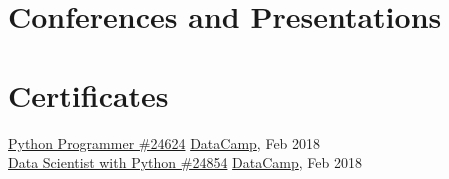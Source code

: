 \documentclass[]{hieudo-build}
\begin{document}
\begin{minipage}[t]{0.65\textwidth}
\sectionsep

\section{Conferences and Presentations}
\sectionsep
{}




\section{Certificates}
\href{https://www.datacamp.com/statement-of-accomplishment/track/2380b142ca0efe8ccf46d72295e6c90ef2b7b165?lipi=urn%3Ali%3Apage%3Ad_flagship3_profile_view_base%3BC877CZzpQNG%2BcsyBdM5s%2Fw%3D%3D}{Python Programmer \#24624} \hfill \href{https://www.datacamp.com/home}{DataCamp}, Feb 2018 \\
\href{https://www.datacamp.com/statement-of-accomplishment/track/acd2c1fde62ac121f65f4e2f004ee9f5cdbd06ba?lipi=urn%3Ali%3Apage%3Ad_flagship3_profile_view_base%3BC877CZzpQNG%2BcsyBdM5s%2Fw%3D%3D}{Data Scientist with Python \#24854} \hfill \href{https://www.datacamp.com/home}{DataCamp}, Feb 2018 \\

\end{minipage} 
\end{document}
